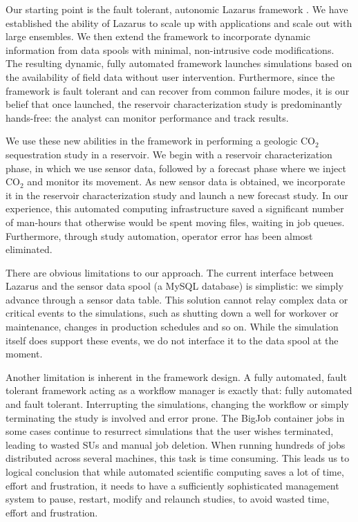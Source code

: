 \documentclass{acm_proc_article-sp}
\begin{document}
Our starting point is the fault tolerant, autonomic Lazarus framework
\cite{gmac}. We have established the ability of Lazarus to scale up 
with applications and scale out with large ensembles. We then extend
the framework to incorporate dynamic information from data spools with
minimal, non-intrusive code modifications. The resulting dynamic, fully
automated framework launches simulations based on the availability of field
data without user intervention. Furthermore, since the framework
is fault tolerant and can recover from common failure modes, it is our
belief that once launched, the reservoir characterization study
is predominantly hands-free: the analyst can monitor performance
and track results.

We use these new abilities in the framework in performing a geologic
CO$_2$ sequestration study in a reservoir. We begin with a reservoir
characterization phase, in which we use sensor data, followed by a 
forecast phase where we inject CO$_2$ and monitor its movement. As new
sensor data is obtained, we incorporate it in the reservoir
characterization study and launch a new forecast study. In our experience,
this automated computing infrastructure saved a significant number
of  man-hours that otherwise would be spent moving files, waiting in job queues.
Furthermore, through study automation, operator error has been
almost eliminated.

There are obvious limitations to our approach. The current interface
between Lazarus and the sensor data spool (a MySQL database) is simplistic:
we simply advance through a sensor data table. This solution cannot
relay complex data or critical events to the simulations, such as
shutting down a well for workover or maintenance, changes in production
schedules and so on. While the simulation itself does support
these events, we do not interface it to the data spool at the moment.

Another limitation is inherent in the framework design. A fully
automated, fault tolerant framework acting as a workflow manager
is exactly that: fully automated and fault tolerant. Interrupting
the simulations, changing the workflow or simply terminating
the study is involved and error prone. The BigJob container jobs
in some cases continue to resurrect simulations that the user wishes
terminated, leading to wasted SUs and manual job deletion. When running
hundreds of jobs distributed across several machines, this task is time consuming.
This leads us to logical conclusion that while automated scientific
computing saves a lot of time, effort and frustration, it needs to have
a sufficiently sophisticated management system to pause, restart,
modify and relaunch studies, to avoid wasted time, effort and
frustration.
\end{document}
